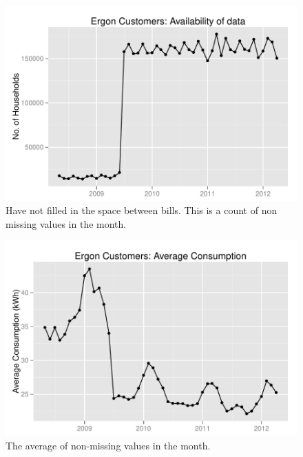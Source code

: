 \documentclass[a4paper,11pt]{article}
\begin{document}
\begin{figure}
\begin{center}
\includegraphics[width=1\textwidth]{figures/ErgonAvailData.pdf}
\caption{Have not filled in the space between bills. This is a count of
non missing values in the month.}
\end{center}
\end{figure}

\begin{figure}
\begin{center}
\includegraphics[width=1\textwidth]{figures/ErgonAvgConsump.pdf}
\caption{The average of non-missing values in the month.}
\end{center}
\end{figure}
\end{document}

